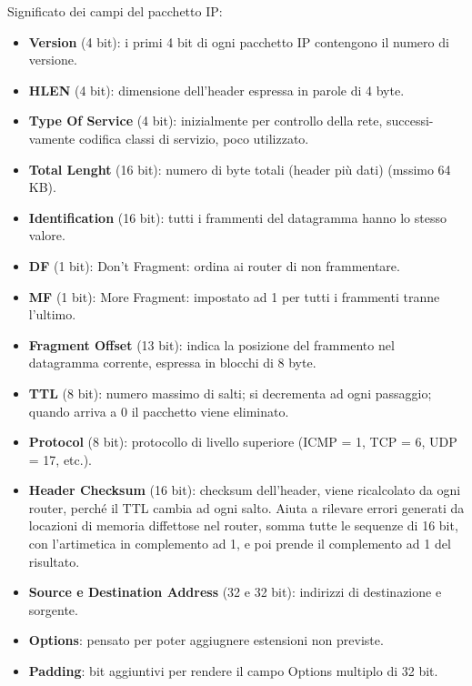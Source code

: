             Significato dei campi del pacchetto IP:
            \begin{itemize}
                \item \textbf{Version} (4 bit): i primi 4 bit di ogni pacchetto IP contengono il numero di versione.
                \item \textbf{HLEN} (4 bit): dimensione dell'header espressa in parole di 4 byte.
                \item \textbf{Type Of Service} (4 bit): inizialmente per controllo della rete, successi-
                vamente codifica classi di servizio, poco utilizzato.
                \item \textbf{Total Lenght} (16 bit): numero di byte totali (header più dati) (mssimo 64 KB).
                \item \textbf{Identification} (16 bit): tutti i frammenti del datagramma hanno lo stesso valore.
                \item \textbf{DF} (1 bit): Don't Fragment: ordina ai router di non frammentare.
                \item \textbf{MF} (1 bit): More Fragment: impostato ad 1 per tutti i frammenti tranne
                l'ultimo.
                \item \textbf{Fragment Offset} (13 bit): indica la posizione del frammento nel datagramma corrente, espressa in blocchi di 8 byte.
                \item \textbf{TTL} (8 bit): numero massimo di salti; si decrementa ad ogni passaggio; quando arriva a 0 il pacchetto viene eliminato.
                \item \textbf{Protocol} (8 bit): protocollo di livello superiore (ICMP = 1, TCP = 6, UDP = 17, etc.).
                \item \textbf{Header Checksum} (16 bit): checksum dell'header, viene ricalcolato da ogni router, perché il TTL cambia ad ogni salto. Aiuta a rilevare errori generati da locazioni di memoria diffettose nel router, somma tutte le sequenze di 16 bit, con l'artimetica in complemento ad 1, e poi prende il complemento ad 1 del risultato.
                \item \textbf{Source e Destination Address} (32 e 32 bit): indirizzi di destinazione e sorgente.
                \item \textbf{Options}: pensato per poter aggiugnere estensioni non previste.
                \item \textbf{Padding}: bit aggiuntivi per rendere il campo Options multiplo di 32 bit.
            \end{itemize}

